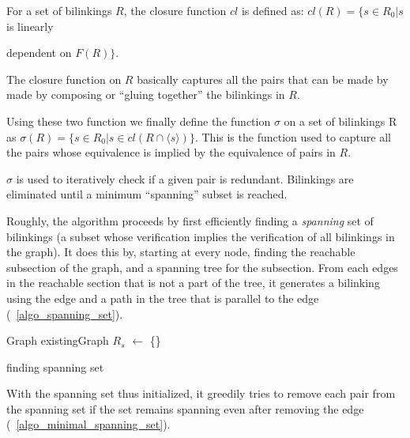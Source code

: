 \documentclass[sigplan,review,anonymous]{acmart}
\begin{document}
For a set of bilinkings $R$, the closure function $cl$ is defined as:
$cl(R) = \{ s\in R_0| s$ is linearly {dependent on $F(R) \}$.

The closure function on $R$ basically captures all the pairs that can be made by made by composing or ``gluing together'' the bilinkings in $R$. 

Using these two function we finally define the function $\sigma$ on a set of bilinkings R as
$\sigma(R) = \{s \in R_0 | s\in cl(R\cap \langle s \rangle) \}$.
This is the function used to capture all the pairs whose equivalence is implied by the equivalence of pairs in $R$.

$\sigma$ is used to iteratively check if a given pair is redundant.
Bilinkings are eliminated until a minimum ``spanning'' subset is reached.

Roughly, the algorithm proceeds by first efficiently finding a \textit{spanning} set of bilinkings (a subset whose verification implies the verification of all bilinkings in the graph).
It does this by, starting at every node, finding the reachable subsection of the graph, and a spanning tree for the subsection.
From each edges in the reachable section that is not a part of the tree, it generates a bilinking using the edge and a path in the tree that is parallel to the edge (~\ref{algo_spanning_set}).

\begin{algorithm}
\label{alg_spanning_set}
\DontPrintSemicolon
{}

Graph existingGraph\;
$R_s$ $\gets$ \{\}\;
\;

\caption{finding spanning set}\label{algo_spanning_set}
\end{algorithm}

With the spanning set thus initialized, it greedily tries to remove each pair from the spanning set if the set remains spanning even after removing the edge (~\ref{algo_minimal_spanning_set}).

\begin{algorithm}
\DontPrintSemicolon
{}


\end{algorithm}}
\end{document}
